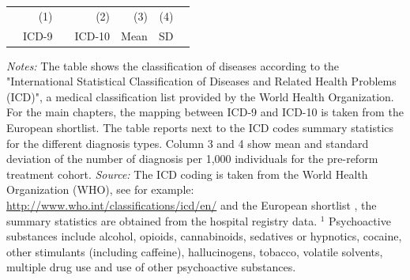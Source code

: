 \documentclass[11pt, a4paper,draft]{article} %
\begin{document}
\begin{landscape}
\begin{table}[h]
\begin{threeparttable}
			\begin{tabular}{lrrrrrr} %
				\toprule %
				&\multicolumn{1}{r}{(1)}& &\multicolumn{1}{r}{(2)}&\multicolumn{1}{r}{(3)} &\multicolumn{1}{r}{(4)}\\
				&\multicolumn{1}{r}{ICD-9} & & \multicolumn{1}{r}{ICD-10}&\multicolumn{1}{r}{Mean}&\multicolumn{1}{r}{SD} \\ 
				\midrule
				
				\bottomrule %
			\end{tabular}
			\begin{tablenotes}
				\scriptsize{ \item \textit{Notes:} The table shows the classification of diseases according to the "International Statistical Classification of Diseases and Related Health Problems (ICD)", a medical classification list provided by the World Health Organization. For the main chapters, the mapping between ICD-9 and ICD-10 is taken from the European shortlist. The table reports next to the ICD codes summary statistics for the different diagnosis types. Column 3 and 4 show mean and standard deviation of the number of diagnosis per 1,000 individuals for the pre-reform treatment cohort. \newline \textit{Source:} The ICD coding is taken from the World Health Organization (WHO), see for example: \href{http://www.who.int/classifications/icd/en/}{http://www.who.int/classifications/icd/en/} and the European shortlist \citep[p. 76]{statistisches2012diagnosedaten}, the summary statistics are obtained from the hospital registry data. \newline\hspace*{15 pt}$^1$ Psychoactive substances include alcohol, opioids, cannabinoids, sedatives or hypnotics, cocaine, other stimulants (including caffeine), hallucinogens, tobacco, volatile solvents, multiple drug use and use of other psychoactive substances. }
			\end{tablenotes}
		\end{threeparttable}
	\end{table}
	\vspace*{\fill}\clearpage 
\end{landscape}
\restoregeometry
\end{document}
